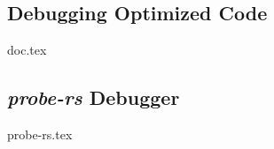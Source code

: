 


\subsection{Debugging Optimized Code}
{doc.tex}


\subsection{\emph{probe-rs} Debugger}
{probe-rs.tex}


%
%
%
%
%


